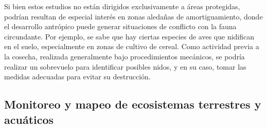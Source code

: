 \documentclass[9t,twocolumn]{article}
\begin{document}
Si bien estos estudios no están dirigidos exclusivamente a áreas
protegidas, podrían resultan de especial interés en zonas aledañas de
amortiguamiento, donde el desarrollo antrópico puede generar situaciones
de conflicto con la fauna circundante. Por ejemplo, se sabe que hay
ciertas especies de aves que nidifican en el suelo, especialmente en
zonas de cultivo de cereal. Como actividad previa a la cosecha,
realizada generalmente bajo procedimientos mecánicos, se podría realizar
un sobrevuelo para identificar posibles nidos, y en su caso, tomar las
medidas adecuadas para evitar su destrucción.

\subsection{Monitoreo y mapeo de ecosistemas terrestres y
acuáticos}\label{monitoreo-y-mapeo-de-ecosistemas-terrestres-y-acuaticos}
\end{document}
